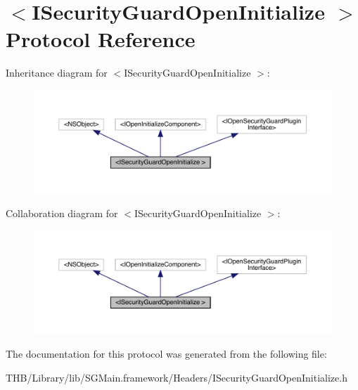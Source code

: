 \hypertarget{protocol_i_security_guard_open_initialize_01-p}{}\section{$<$I\+Security\+Guard\+Open\+Initialize $>$ Protocol Reference}
\label{protocol_i_security_guard_open_initialize_01-p}


Inheritance diagram for $<$I\+Security\+Guard\+Open\+Initialize $>$\+:\nopagebreak
\begin{figure}[H]
\begin{center}
\leavevmode
\includegraphics[width=350pt]{protocol_i_security_guard_open_initialize_01-p__inherit__graph}
\end{center}
\end{figure}


Collaboration diagram for $<$I\+Security\+Guard\+Open\+Initialize $>$\+:\nopagebreak
\begin{figure}[H]
\begin{center}
\leavevmode
\includegraphics[width=350pt]{protocol_i_security_guard_open_initialize_01-p__coll__graph}
\end{center}
\end{figure}


The documentation for this protocol was generated from the following file\+:\begin{DoxyCompactItemize}
\item 
T\+H\+B/\+Library/lib/\+S\+G\+Main.\+framework/\+Headers/I\+Security\+Guard\+Open\+Initialize.\+h\end{DoxyCompactItemize}
